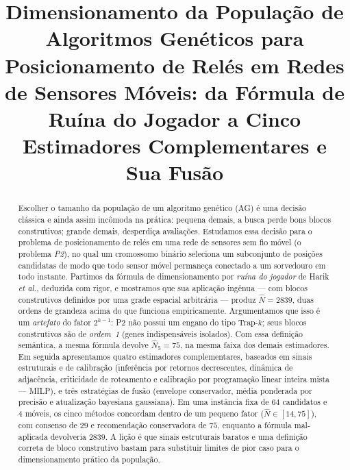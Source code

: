 \documentclass[conference]{IEEEtran}
\newcommand{\Nhat}{\hat{N}}
\begin{document}
\title{Dimensionamento da População de Algoritmos Genéticos para Posicionamento
de Relés em Redes de Sensores Móveis: da Fórmula de Ruína do Jogador a Cinco
Estimadores Complementares e Sua Fusão}

\author{%
}

\maketitle

\begin{abstract}
Escolher o tamanho da população de um algoritmo genético (AG) é uma decisão
clássica e ainda assim incômoda na prática: pequena demais, a busca perde bons
blocos construtivos; grande demais, desperdiça avaliações. Estudamos essa decisão
para o problema de posicionamento de relés em uma rede de sensores sem fio móvel
(o problema \emph{P2}), no qual um cromossomo binário seleciona um subconjunto de
posições candidatas de modo que todo sensor móvel permaneça conectado a um
sorvedouro em todo instante. Partimos da fórmula de dimensionamento por
\emph{ruína do jogador} de Harik \emph{et al.}, deduzida com rigor, e mostramos que
sua aplicação ingênua --- com blocos construtivos definidos por uma grade espacial
arbitrária --- produz $\Nhat=2839$, duas ordens de grandeza acima do que funciona
empiricamente. Argumentamos que isso é um \emph{artefato} do fator $2^{k-1}$:
P2 não possui um engano do tipo Trap-$k$; seus blocos construtivos são de
\emph{ordem~1} (genes indispensáveis isolados). Com essa definição semântica, a
mesma fórmula devolve $\Nhat_5=75$, na mesma faixa dos demais estimadores. Em
seguida apresentamos quatro estimadores complementares, baseados em sinais
estruturais e de calibração (inferência por retornos decrescentes, dinâmica de
adjacência, criticidade de roteamento e calibração por programação linear inteira
mista --- MILP), e três estratégias de fusão (envelope conservador, média
ponderada por precisão e atualização bayesiana gaussiana). Em uma instância fixa
de $64$ candidatos e $4$ móveis, os cinco métodos concordam dentro de um pequeno
fator ($\Nhat\in[14,75]$), com consenso de $29$ e recomendação conservadora de
$75$, enquanto a fórmula mal-aplicada devolveria $2839$. A lição é que sinais
estruturais baratos e uma definição correta de bloco construtivo bastam para
substituir limites de pior caso para o dimensionamento prático da população.
\end{abstract}
\end{document}
